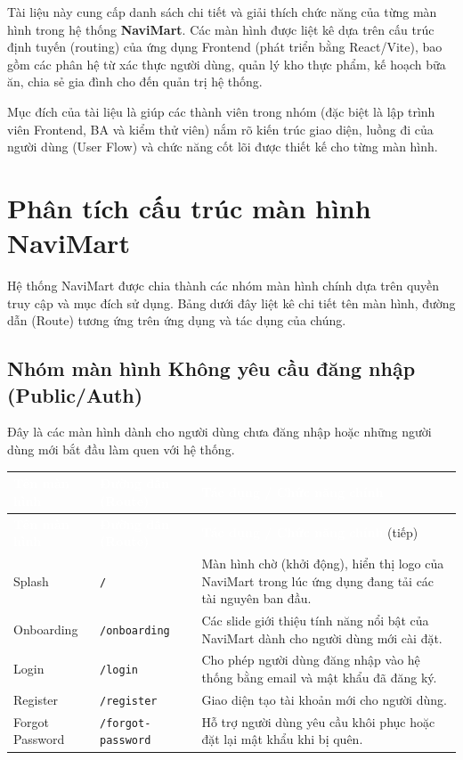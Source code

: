 \documentclass[12pt,a4paper]{article}
\newcommand{\code}[1]{\texttt{#1}}
\newcommand{\thead}[1]{\textbf{\textcolor{white}{#1}}}
\begin{document}
Tài liệu này cung cấp danh sách chi tiết và giải thích chức năng của từng màn hình trong hệ thống \textbf{NaviMart}. Các màn hình được liệt kê dựa trên cấu trúc định tuyến (routing) của ứng dụng Frontend (phát triển bằng React/Vite), bao gồm các phân hệ từ xác thực người dùng, quản lý kho thực phẩm, kế hoạch bữa ăn, chia sẻ gia đình cho đến quản trị hệ thống.

Mục đích của tài liệu là giúp các thành viên trong nhóm (đặc biệt là lập trình viên Frontend, BA và kiểm thử viên) nắm rõ kiến trúc giao diện, luồng đi của người dùng (User Flow) và chức năng cốt lõi được thiết kế cho từng màn hình.

\section{Phân tích cấu trúc màn hình NaviMart}

Hệ thống NaviMart được chia thành các nhóm màn hình chính dựa trên quyền truy cập và mục đích sử dụng. Bảng dưới đây liệt kê chi tiết tên màn hình, đường dẫn (Route) tương ứng trên ứng dụng và tác dụng của chúng.

\subsection{Nhóm màn hình Không yêu cầu đăng nhập (Public/Auth)}

Đây là các màn hình dành cho người dùng chưa đăng nhập hoặc những người dùng mới bắt đầu làm quen với hệ thống.

\begin{longtable}{|>{\raggedright\arraybackslash}p{3.5cm}|>{\raggedright\arraybackslash}p{4cm}|>{\raggedright\arraybackslash}p{7.5cm}|}
\hline
\rowcolor{headerblue}
\thead{Tên màn hình} & \thead{Đường dẫn (Route)} & \thead{Tác dụng / Chức năng chính} \\
\hline
\endfirsthead
\hline
\rowcolor{headerblue}
\thead{Tên màn hình} & \thead{Đường dẫn (Route)} & \thead{Tác dụng / Chức năng chính} (tiếp) \\
\hline
\endhead
Splash & \code{/} & Màn hình chờ (khởi động), hiển thị logo của NaviMart trong lúc ứng dụng đang tải các tài nguyên ban đầu. \\
\hline
Onboarding & \code{/onboarding} & Các slide giới thiệu tính năng nổi bật của NaviMart dành cho người dùng mới cài đặt. \\
\hline
Login & \code{/login} & Cho phép người dùng đăng nhập vào hệ thống bằng email và mật khẩu đã đăng ký. \\
\hline
Register & \code{/register} & Giao diện tạo tài khoản mới cho người dùng. \\
\hline
Forgot Password & \code{/forgot-password} & Hỗ trợ người dùng yêu cầu khôi phục hoặc đặt lại mật khẩu khi bị quên. \\
\hline
\end{longtable}
\end{document}
